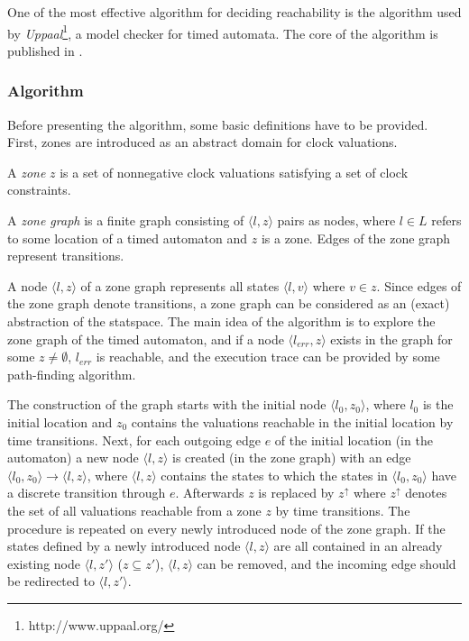 One of the most effective algorithm for deciding reachability is the algorithm used by \emph{Uppaal}\footnote{http://www.uppaal.org/}, a model checker for timed automata. The core of the algorithm is published in \cite{bengtsson2004timed}.
\subsubsection{Algorithm}

Before presenting the algorithm, some basic definitions have to be provided. First, zones are introduced as an abstract domain for clock valuations.

\begin{dfn}
	A \emph{zone} $z$ is a set of nonnegative clock valuations satisfying a set of clock constraints.
\end{dfn}


\begin{dfn}
	A \emph{zone graph} is a finite graph consisting of $\langle l,z \rangle$ pairs as nodes, where $l \in L$ refers to some location of a timed automaton and $z$ is a zone. Edges of the zone graph represent transitions. 
\end{dfn}

A node $\langle l,z \rangle$ of a zone graph represents all states $\langle l,v \rangle$ where $v \in z$. Since edges of the zone graph denote transitions, a zone graph can be considered as an (exact) abstraction of the statspace. The main idea of the algorithm is to explore the zone graph of the timed automaton, and if a node $\langle l_{err},z \rangle$ exists in the graph for some $z \neq \emptyset$, $l_{err}$ is reachable, and the execution trace can be provided by some path-finding algorithm.

The construction of the graph starts with the initial node  $\langle l_0,z_0 \rangle$,
where $l_0$ is the initial location and $z_0$ contains the valuations reachable in the initial location by time transitions. 
Next, for each outgoing edge $e$ of the initial location (in the automaton) a new node  $\langle l,z \rangle$ is created (in the zone graph) with an edge
$\langle l_0,z_0 \rangle \to \langle l,z \rangle$, where $\langle l,z \rangle$ contains the states to which the states in $\langle l_0,z_0 \rangle$ have a discrete transition through $e$. Afterwards $z$ is replaced by $z^\uparrow$ where $z^\uparrow$ denotes the set of all valuations reachable from a zone $z$ by time transitions.  The procedure is repeated on every newly introduced node of the zone graph. If the states defined by a newly introduced node $\langle l,z \rangle$ are all contained in an already existing node $\langle l,z' \rangle$ ($z \subseteq z'$), $\langle l,z \rangle$ can be removed, and the incoming edge should be redirected to $\langle l,z' \rangle$.

